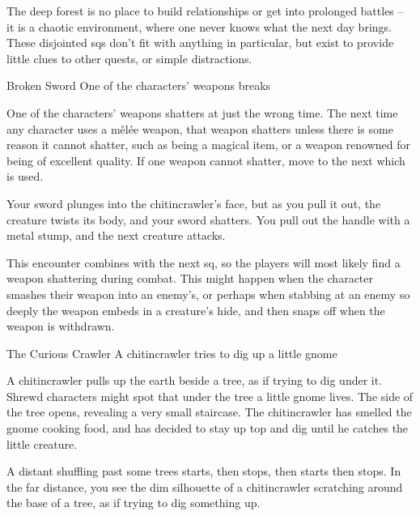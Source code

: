 \label{interruptions}

\noindent
The deep forest is no place to build relationships or get into prolonged battles -- it is a chaotic environment, where one never knows what the next day brings.
These disjointed \glspl{sq} don't fit with anything in particular, but exist to provide little clues to other quests, or simple distractions.

{\squash Broken Sword}%
{One of the characters' weapons breaks}%

One of the characters' weapons shatters at just the wrong time.
The next time any character uses a m\^el\'ee weapon, that weapon shatters unless there is some reason it cannot shatter, such as being a magical item, or a weapon renowned for being of excellent quality.
If one weapon cannot shatter, move to the next which is used.

\begin{boxtext}

  Your sword plunges into the chitincrawler's face, but as you pull it out, the creature twists its body, and your sword shatters.
  You pull out the handle with a metal stump, and the next creature attacks.

\end{boxtext}

This encounter combines with the next \gls{sq}, so the players will most likely find a weapon shattering during combat.
This might happen when the character smashes their weapon into an enemy's, or perhaps when stabbing at an enemy so deeply the weapon embeds in a creature's hide, and then snaps off when the weapon is withdrawn.

{The Curious Crawler}%
{A chitincrawler tries to dig up a little gnome}%

A chitincrawler pulls up the earth beside a tree, as if trying to dig under it.
Shrewd characters might spot that under the tree a little gnome lives.
The side of the tree opens, revealing a very small staircase.
The chitincrawler has smelled the gnome cooking food, and has decided to stay up top and dig until he catches the little creature.

\begin{boxtext}

  A distant shuffling past some trees starts, then stops, then starts then stops.
  In the far distance, you see the dim silhouette of a chitincrawler scratching around the base of a tree, as if trying to dig something up.

\end{boxtext}

